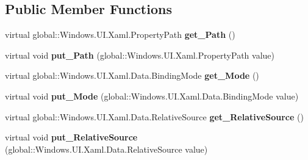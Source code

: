 \subsection*{Public Member Functions}
\begin{DoxyCompactItemize}
\item 
\mbox{\label{class_windows_1_1_u_i_1_1_xaml_1_1_data_1_1_binding_a3670a1efb4d8824b1bc00bd91af01fc2}} 
virtual global\+::\+Windows.\+U\+I.\+Xaml.\+Property\+Path {\bfseries get\+\_\+\+Path} ()
\item 
\mbox{\label{class_windows_1_1_u_i_1_1_xaml_1_1_data_1_1_binding_a9f8d22b6891219f8db424a49a91ff24a}} 
virtual void {\bfseries put\+\_\+\+Path} (global\+::\+Windows.\+U\+I.\+Xaml.\+Property\+Path value)
\item 
\mbox{\label{class_windows_1_1_u_i_1_1_xaml_1_1_data_1_1_binding_ab0c392cb49f178e29a63d12a683e2c4f}} 
virtual global\+::\+Windows.\+U\+I.\+Xaml.\+Data.\+Binding\+Mode {\bfseries get\+\_\+\+Mode} ()
\item 
\mbox{\label{class_windows_1_1_u_i_1_1_xaml_1_1_data_1_1_binding_abc7d75756c9f93a8ec488cecb97265c5}} 
virtual void {\bfseries put\+\_\+\+Mode} (global\+::\+Windows.\+U\+I.\+Xaml.\+Data.\+Binding\+Mode value)
\item 
\mbox{\label{class_windows_1_1_u_i_1_1_xaml_1_1_data_1_1_binding_ac23f4899bbf0de1eaba1d8fc24e9f7c3}} 
virtual global\+::\+Windows.\+U\+I.\+Xaml.\+Data.\+Relative\+Source {\bfseries get\+\_\+\+Relative\+Source} ()
\item 
\mbox{\label{class_windows_1_1_u_i_1_1_xaml_1_1_data_1_1_binding_a9e13fc7038d328684876c114c0262cd2}} 
virtual void {\bfseries put\+\_\+\+Relative\+Source} (global\+::\+Windows.\+U\+I.\+Xaml.\+Data.\+Relative\+Source value)
\item 
\mbox{\label{class_windows_1_1_u_i_1_1_xaml_1_1_data_1_1_binding_a93680aa9f018dd4f75ac7515c0a00ebf}} 

\end{DoxyCompactItemize}

